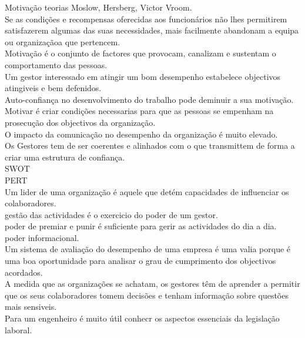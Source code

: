 Motivação teorias Moslow, Hersberg, Victor Vroom.\\
Se as condições e recompensas oferecidas aos funcionários não lhes permitirem satisfazerem algumas das suas necessidades, mais facilmente abandonam a equipa ou organizaçãoa que pertencem.\\
Motivação é o conjunto de factores que provocam, canalizam e sustentam o comportamento das pessoas.\\

Um gestor interessado em atingir um bom desempenho estabelece objectivos atingiveis e bem defenidos.\\
Auto-confiança no desenvolvimento do trabalho pode deminuir a sua motivação.\\
Motivar é criar condições necessarias para que as pessoas se empenham na prosecução dos objectivos da organização.\\

O impacto da comunicação no desempenho da organização é muito elevado.\\
Os Gestores tem de ser coerentes e alinhados com o que transmittem de forma a criar uma estrutura de confiança.\\

SWOT\\
PERT\\

Um lider de uma organização é aquele que detém capacidades de influenciar os colaboradores.\\

gestão das actividades é o exercicio do poder de um gestor.\\

poder de premiar e punir é suficiente para gerir as actividades do dia a dia.\\

poder informacional.\\

Um sistema de avaliação do desempenho de uma empresa é uma valia porque é uma boa oportunidade para analisar o grau de cumprimento dos objectivos acordados.\\

A medida que as organizações se achatam, os gestores têm de aprender a permitir que os seus colaboradores tomem decisões e tenham informação sobre questões mais sensiveis.\\

Para um engenheiro é muito útil conhecr os aspectos essenciais da legislação laboral.\\

